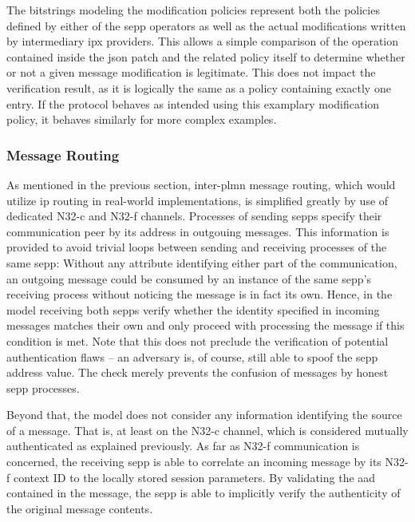 The bitstrings modeling the modification policies represent both the policies defined by either of the \gls{sepp} operators as well as the actual modifications written by intermediary \gls{ipx} providers.
This allows a simple comparison of the operation contained inside the \gls{json} patch and the related policy itself to determine whether or not a given message modification is legitimate.
This does not impact the verification result, as it is logically the same as a policy containing exactly one entry.
If the protocol behaves as intended using this examplary modification policy, it behaves similarly for more complex examples.

\subsubsection{Message Routing}

As mentioned in the previous section, inter-\gls{plmn} message routing, which would utilize \gls{ip} routing in real-world implementations, is simplified greatly by use of dedicated N32-c and N32-f channels.
Processes of sending \glspl{sepp} specify their communication peer by its address in outgouing messages.
This information is provided to avoid trivial loops between sending and receiving processes of the same \gls{sepp}:
Without any attribute identifying either part of the communication, an outgoing message could be consumed by an instance of the same \gls{sepp}'s receiving process without noticing the message is in fact its own.
Hence, in the model receiving both \glspl{sepp} verify whether the identity specified in incoming messages matches their own and only proceed with processing the message if this condition is met.
Note that this does not preclude the verification of potential authentication flaws -- an adversary is, of course, still able to spoof the \gls{sepp} address value.
The check merely prevents the confusion of messages by honest \gls{sepp} processes.

Beyond that, the model does not consider any information identifying the source of a message.
That is, at least on the N32-c channel, which is considered mutually authenticated as explained previously.
As far as N32-f communication is concerned, the receiving \gls{sepp} is able to correlate an incoming message by its N32-f context ID to the locally stored session parameters.
By validating the \gls{aad} contained in the message, the \gls{sepp} is able to implicitly verify the authenticity of the original message contents.

